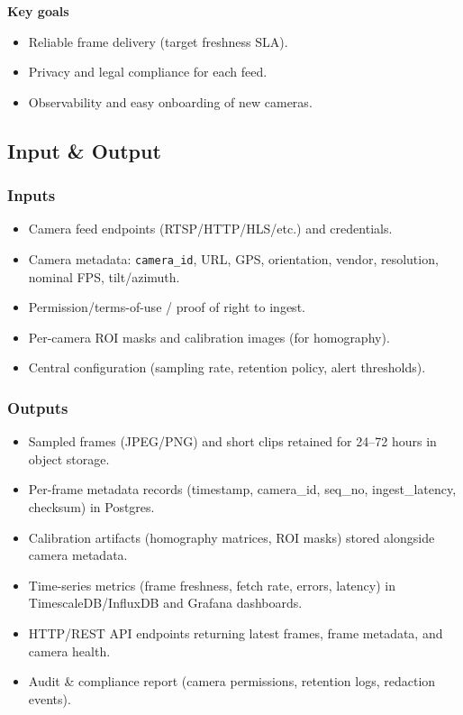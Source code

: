 		    \textbf{Key goals}
\begin{itemize}
  \item Reliable frame delivery (target freshness SLA).
  \item Privacy and legal compliance for each feed.
  \item Observability and easy onboarding of new cameras.
\end{itemize}

\subsection{Input \& Output}
\subsubsection{Inputs}
\begin{itemize}
  \item Camera feed endpoints (RTSP/HTTP/HLS/etc.) and credentials.
  \item Camera metadata: \texttt{camera\_id}, URL, GPS, orientation, vendor, resolution, nominal FPS, tilt/azimuth.
  \item Permission/terms-of-use / proof of right to ingest.
  \item Per-camera ROI masks and calibration images (for homography).
  \item Central configuration (sampling rate, retention policy, alert thresholds).
\end{itemize}

\subsubsection{Outputs}
\begin{itemize}
  \item Sampled frames (JPEG/PNG) and short clips retained for 24--72 hours in object storage.
  \item Per-frame metadata records (timestamp, camera\_id, seq\_no, ingest\_latency, checksum) in Postgres.
  \item Calibration artifacts (homography matrices, ROI masks) stored alongside camera metadata.
  \item Time-series metrics (frame freshness, fetch rate, errors, latency) in TimescaleDB/InfluxDB and Grafana dashboards.
  \item HTTP/REST API endpoints returning latest frames, frame metadata, and camera health.
  \item Audit \& compliance report (camera permissions, retention logs, redaction events).
\end{itemize}

